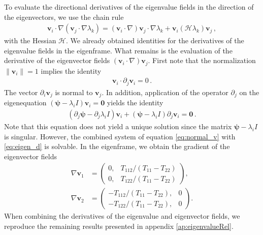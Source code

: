 \documentclass[a4paper, 11pt]{article}
\begin{document}
To evaluate the directional derivatives of the eigenvalue fields in the direction of the eigenvectors, we use the chain rule 
\begin{align}
\bm{v}_i \cdot \nabla (\bm{v}_j \cdot \nabla \lambda_k)= (\bm{v}_i \cdot  \nabla )\bm{v}_j \cdot \nabla \lambda_k + \bm{v}_i (\mathcal{H} \lambda_k )\bm{v}_j \,,
\end{align}
with the Hessian $\mathcal{H}$. We already obtained identities for the derivatives of the eigenvalue fields in the eigenframe. What remains is the evaluation of the derivative of the eigenvector fields $(\bm{v}_i \cdot \nabla) \bm{v}_j$. First note that the normalization $\|\bm{v}_i\|=1$ implies the identity
\begin{align}
\bm{v}_i \cdot \partial_j \bm{v}_i=0\,.\label{eq:normal_v}
\end{align} 
The vector $\partial_i \bm{v}_j$ is normal to $\bm{v}_j$. In addition, application of the operator $\partial_j$ on the eigenequation $(\bm{\psi}-\lambda_i I)\bm{v}_i=\bm{0}$ yields the identity
\begin{align}
(\partial_j \bm{\psi} - \partial_j \lambda_i I)\bm{v}_i + (\bm{\psi}-\lambda_i I)\partial_j \bm{v}_i=\bm{0}\,. \label{eq:eigen_d}
\end{align}
Note that this equation does not yield a unique solution since the matrix $\bm{\psi}-\lambda_i I$ is singular. However, the combined system of equation \eqref{eq:normal_v} with \eqref{eq:eigen_d} is solvable. In the eigenframe, we obtain the gradient of the eigenvector fields
\begin{align}
\nabla \bm{v}_1 &= \begin{pmatrix}
0, & T_{112}/(T_{11}-T_{22})\\
0, & T_{122}/(T_{11}-T_{22})
\end{pmatrix},\\
\nabla \bm{v}_2 &= \begin{pmatrix}
-T_{112}/(T_{11}-T_{22}), & 0\\
-T_{122}/(T_{11}-T_{22}), & 0
\end{pmatrix}.
\end{align}
When combining the derivatives of the eigenvalue and eigenvector fields, we reproduce the remaining results presented in appendix \ref{ap:eigenvalueRel}.

\end{document}
